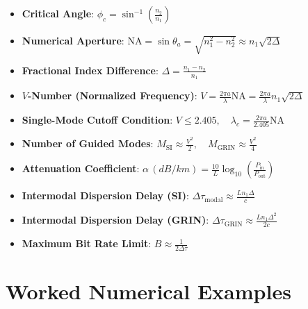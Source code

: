 \begin{quickrevision}
\begin{itemize}
    \item \textbf{Critical Angle}: $\phi_c = \sin^{-1}\left(\frac{n_2}{n_1}\right)$
    \item \textbf{Numerical Aperture}: $\text{NA} = \sin\theta_a = \sqrt{n_1^2 - n_2^2} \approx n_1 \sqrt{2\Delta}$
    \item \textbf{Fractional Index Difference}: $\Delta = \frac{n_1 - n_2}{n_1}$
    \item \textbf{$V$-Number (Normalized Frequency)}: $V = \frac{2\pi a}{\lambda} \text{NA} = \frac{2\pi a}{\lambda} n_1 \sqrt{2\Delta}$
    \item \textbf{Single-Mode Cutoff Condition}: $V \le 2.405, \quad \lambda_c = \frac{2\pi a}{2.405}\text{NA}$
    \item \textbf{Number of Guided Modes}: $M_{\text{SI}} \approx \frac{V^2}{2}, \quad M_{\text{GRIN}} \approx \frac{V^2}{4}$
    \item \textbf{Attenuation Coefficient}: $\alpha\,(\si{dB/km}) = \frac{10}{L}\log_{10}\left(\frac{P_{\text{in}}}{P_{\text{out}}}\right)$
    \item \textbf{Intermodal Dispersion Delay (SI)}: $\Delta \tau_{\text{modal}} \approx \frac{L n_1 \Delta}{c}$
    \item \textbf{Intermodal Dispersion Delay (GRIN)}: $\Delta \tau_{\text{GRIN}} \approx \frac{L n_1 \Delta^2}{2 c}$
    \item \textbf{Maximum Bit Rate Limit}: $B \approx \frac{1}{2\Delta \tau}$
\end{itemize}
\end{quickrevision}

\section{Worked Numerical Examples}

